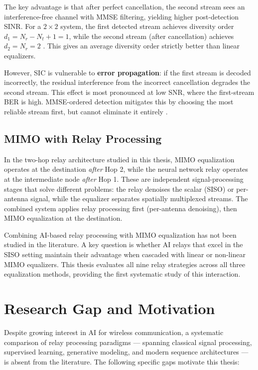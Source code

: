 The key advantage is that after perfect cancellation, the second stream sees an interference-free channel with MMSE filtering, yielding higher post-detection SINR. For a \(2 \times 2\) system, the first detected stream achieves diversity order \(d_1 = N_r - N_t + 1 = 1\), while the second stream (after cancellation) achieves \(d_2 = N_r = 2\) \cite{zheng2003diversity}. This gives an average diversity order strictly better than linear equalizers.

However, SIC is vulnerable to \textbf{error propagation}: if the first stream is decoded incorrectly, the residual interference from the incorrect cancellation degrades the second stream. This effect is most pronounced at low SNR, where the first-stream BER is high. MMSE-ordered detection mitigates this by choosing the most reliable stream first, but cannot eliminate it entirely \cite{loyka2004performance}.

\subsection{MIMO with Relay Processing}\label{sec:mimo-with-relay-processing}

In the two-hop relay architecture studied in this thesis, MIMO equalization operates at the destination \emph{after} Hop 2, while the neural network relay operates at the intermediate node \emph{after} Hop 1. These are independent signal-processing stages that solve different problems: the relay denoises the scalar (SISO) or per-antenna signal, while the equalizer separates spatially multiplexed streams. The combined system applies relay processing first (per-antenna denoising), then MIMO equalization at the destination.

Combining AI-based relay processing with MIMO equalization has not been studied in the literature. A key question is whether AI relays that excel in the SISO setting maintain their advantage when cascaded with linear or non-linear MIMO equalizers. This thesis evaluates all nine relay strategies across all three equalization methods, providing the first systematic study of this interaction.

\section{Research Gap and Motivation}\label{sec:research-gap-and-motivation}

Despite growing interest in AI for wireless communication, a systematic comparison of relay processing paradigms --- spanning classical signal processing, supervised learning, generative modeling, and modern sequence architectures --- is absent from the literature. The following specific gaps motivate this thesis:

